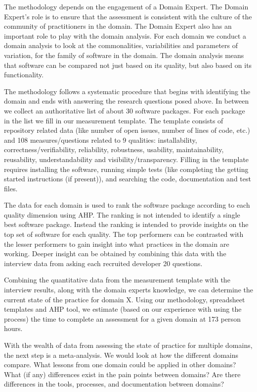 \documentclass[runningheads]{llncs}
\begin{document}
The methodology depends on the engagement of a Domain Expert.  The Domain
Expert's role is to ensure that the assessment is consistent with the culture of
the community of practitioners in the domain.  The Domain Expert also has an
important role to play with the domain analysis.  For each domain we 
conduct a domain analysis to look at the commonalities, variabilities and
parameters of variation, for the family of software in the domain.  The domain
analysis means that software can be compared not just based on its quality, but
also based on its functionality.

The methodology follows a systematic procedure that begins with identifying the
domain and ends with answering the research questions posed above.  In between
we collect an authoritative list of about 30 software packages.  For each
package in the list we fill in our measurement template.  The template consists
of repository related data (like number of open issues, number of lines of code,
etc.) and 108 measures/questions related to 9 qualities: installability,
correctness/verifiability, reliability, robustness, usability, maintainability,
reusability, understandability and visibility/transparency. Filling in the
template requires installing the software, running simple tests (like completing
the getting started instructions (if present)), and searching the code,
documentation and test files.

The data for each domain is used to rank the software package according to each
quality dimension using AHP.  The ranking is not intended to identify a single
best software package.  Instead the ranking is intended to provide insights on
the top set of software for each quality.  The top performers can be contrasted
with the lesser performers to gain insight into what practices in the domain are
working.  Deeper insight can be obtained by combining this data with the
interview data from asking each recruited developer 20 questions.

Combining the quantitative data from the measurement template with the interview
results, along with the domain experts knowledge, we can determine the current
state of the practice for domain X.  Using our methodology, spreadsheet
templates and AHP tool, we estimate (based on our experience with using the
process) the time to complete an assessment for a given domain at 173 person
hours.

With the wealth of data from assessing the state of practice for multiple
domains, the next step is a meta-analysis.  We would look at how the different
domains compare. What lessons from one domain could be applied in other domains?
What (if any) differences exist in the pain points between domains?  Are there
differences in the tools, processes, and documentation between domains?
\end{document}
